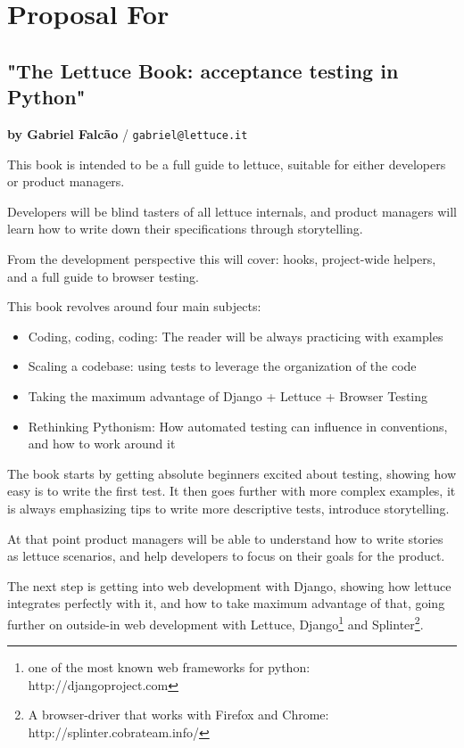 \documentclass[letterpaper]{article}
\begin{document}
\section*{Proposal For}

\subsection*{"The Lettuce Book: acceptance testing in Python"}
\normalsize\textbf{by Gabriel Falcão} \large{/} \texttt{gabriel@lettuce.it}

\normalsize

This book is intended to be a full guide to lettuce, suitable for
either developers or product managers.

Developers will be blind tasters of all lettuce internals, and product
managers will learn how to write down their specifications through
storytelling.

\noindent
From the development perspective this will cover: hooks, project-wide
helpers, and a full guide to browser testing.

\noindent
This book revolves around four main subjects:

\begin{itemize}

\item{Coding, coding, coding: The reader will be always practicing with examples}

\item{Scaling a codebase: using tests to leverage the organization of the code}

\item{Taking the maximum advantage of Django + Lettuce + Browser Testing}

\item{Rethinking Pythonism: How automated testing can influence in conventions, and how to work around it}
\end{itemize}


The book starts by getting absolute beginners excited about testing, showing how easy is to write the first test.
It then goes further with more complex examples, it is always emphasizing
tips to write more descriptive tests, introduce storytelling.

At that point product managers will be able to understand how to write
stories as lettuce scenarios, and help developers to focus on their
goals for the product.

\noindent
The next step is getting into web development with Django, showing how
lettuce integrates perfectly with it, and how to take maximum
advantage of that, going further on outside-in web development with
Lettuce, Django\footnote{one of the most known web frameworks for python: http://djangoproject.com} and Splinter\footnote{A browser-driver that works with Firefox and Chrome: http://splinter.cobrateam.info/}.
\end{document}
